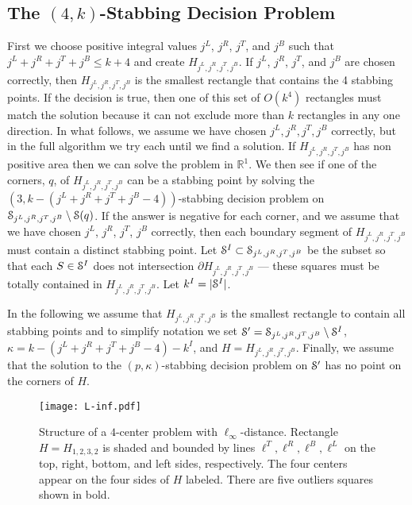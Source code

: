 \documentclass[11pt]{myclass}
\renewcommand{\b}[1]{\ensuremath{\mathbb{#1}}}
\newcommand{\EuS}{\ensuremath{\EuScript{S}}}
\begin{document}
\subsection{The $(4,k)$-Stabbing Decision Problem}

First we choose positive integral values $j^L$, $j^R$, $j^T$, and $j^B$ such that $j^L + j^R + j^T + j^B \leq k+4$ and create $H_{j^L, j^R, j^T, j^B}$.  
If $j^L$, $j^R$, $j^T$, and $j^B$ are chosen correctly, then $H_{j^L, j^R, j^T, j^B}$ is the smallest rectangle that contains the 4 stabbing points.  If the decision is true, then one of this set of $O(k^4)$ rectangles must match the solution because it can not exclude more than $k$ rectangles in any one direction.
In what follows, we assume we have chosen $j^L, j^R, j^T, j^B$ correctly, but in the full algorithm we try each until we find a solution.  
If $H_{j^L, j^R, j^T, j^B}$ has non positive area then we can solve the problem in $\b{R}^1$.  We then see if one of the corners, $q$, of $H_{j^L, j^R, j^T, j^B}$ can be a stabbing point by solving the $(3,k-(j^L+j^R + j^T + j^B-4))$-stabbing decision problem on $\EuS_{j^L, j^R, j^T, j^B} \setminus \EuS(q)$.  If the answer is negative for each corner, and we assume that we have chosen $j^L$, $j^R$, $j^T$, $j^B$ correctly, then each boundary segment of $H_{j^L, j^R, j^T, j^B}$ must contain a distinct stabbing point.  
Let $\EuS^I \subset \EuS_{j^L, j^R, j^T, j^B}$ be the subset so that each $S \in \EuS^I$ does not intersection $\partial H_{j^L, j^R, j^T, j^B}$ --- these squares must be totally contained in $H_{j^L, j^R, j^T, j^B}$.  Let $k^I = |\EuS^I|$.  

In the following we assume that $H_{j^L, j^R, j^T, j^B}$ is the smallest rectangle to contain all stabbing points and to simplify notation we set $\EuS^\prime = \EuS_{j^L, j^R, j^T, j^B} \setminus \EuS^I$, $\kappa = k-(j^L+j^R + j^T + j^B-4) - k^I$, and $H = H_{j^L,j^R,j^T,j^B}$.  Finally, we assume that the solution to the $(p,\kappa)$-stabbing decision problem on $\EuS^\prime$ has no point on the corners of $H$.  










\begin{figure}[h!!t]
  \centering
  \texttt{[image: L-inf.pdf]}
  \caption{\label{fig:rect4}
                Structure of a $4$-center problem with $\ell_\infty$-distance.  Rectangle $H = H_{1,2,3,2}$ is shaded and bounded by lines $\ell^T, \ell^R, \ell^B, \ell^L$ on the top, right, bottom, and left sides, respectively.  The four centers appear on the four sides of $H$ labeled.  There are five outliers squares shown in bold.}
\end{figure}
\end{document}

